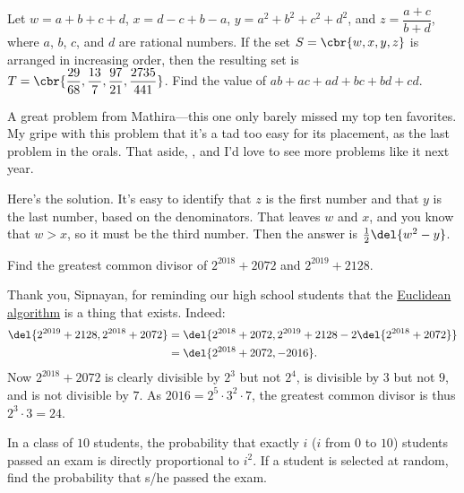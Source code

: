 \documentclass[11pt,paper=letter]{scrartcl}
\begin{document}
\begin{probboxed}
   Let $w = a + b + c + d$, $x = d - c + b - a$, $y = a^2 + b^2 + c^2 + d^2$, and $z = \dfrac{a+c}{b+d}$, where $a$, $b$, $c$, and $d$ are rational numbers. If the set $S = \cbr{w, x, y, z}$ is arranged in increasing order, then the resulting set is $T = \cbr{\dfrac{29}{68}, \dfrac{13}7, \dfrac{97}{21}, \dfrac{2735}{441}}$. Find the value of $ab + ac + ad + bc + bd + cd$.
\end{probboxed}

A great problem from Mathira---this one only barely missed my top ten favorites. My gripe with this problem that it's a tad too easy for its placement, as the last problem in the orals. That aside, , and I'd love to see more problems like it next year.

Here's the solution. It's easy to identify that $z$ is the first number and that $y$ is the last number, based on the denominators. That leaves $w$ and $x$, and you know that $w > x$, so it must be the third number. Then the answer is $\frac12\del{w^2 - y}$.

\begin{probboxed}
   Find the greatest common divisor of $2^{2018} + 2072$ and $2^{2019} + 2128$.
\end{probboxed}

Thank you, Sipnayan, for reminding our high school students that the \href{https://en.wikipedia.org/wiki/Euclidean_algorithm}{Euclidean algorithm} is a thing that exists. Indeed:
\begin{align*}
  \del{2^{2019} + 2128, 2^{2018} + 2072}
  &= \del{2^{2018} + 2072, 2^{2019} + 2128 - 2\del{2^{2018} + 2072}} \\
  &= \del{2^{2018} + 2072, -2016}.
\end{align*}
Now $2^{2018} + 2072$ is clearly divisible by $2^3$ but not $2^4$, is divisible by $3$ but not $9$, and is not divisible by $7$. As $2016 = 2^5 \cdot 3^2 \cdot 7$, the greatest common divisor is thus $2^3 \cdot 3 = 24$.

\begin{probboxed}
   In a class of $10$ students, the probability that exactly $i$ ($i$ from $0$ to $10$) students passed an exam is directly proportional to $i^2$. If a student is selected at random, find the probability that s/he passed the exam.
\end{probboxed}
\end{document}
